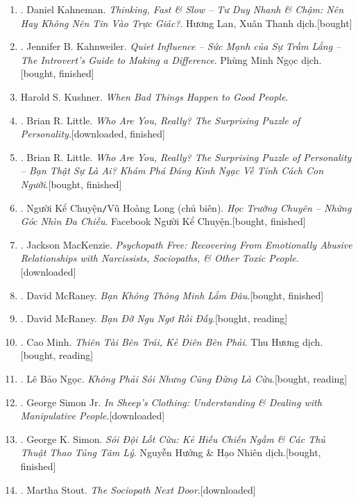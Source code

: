 \documentclass{article}
\begin{document}
\begin{enumerate}
	\item \cite{Kahneman2022}. Daniel Kahneman. \textit{Thinking, Fast \& Slow -- Tư Duy Nhanh \& Chậm: Nên Hay Không Nên Tin Vào Trực Giác?}. Hương Lan, Xuân Thanh dịch.\hfill\textsf{[bought]}
	\item \cite{Kahnweiler2022}. Jennifer B. Kahnweiler. \textit{Quiet Influence -- Sức Mạnh của Sự Trầm Lắng -- The Introvert's Guide to Making a Difference}. Phùng Minh Ngọc dịch.\hfill\textsf{[bought, finished]}
	\item Harold S. Kushner. \textit{When Bad Things Happen to Good People}.
	\item \cite{Little2017}. Brian R. Little. \textit{Who Are You, Really? The Surprising Puzzle of Personality}.\hfill\textsf{[downloaded, finished]}
	\item \cite{Little2023}. Brian R. Little. \textit{Who Are You, Really? The Surprising Puzzle of Personality -- Bạn Thật Sự Là Ai? Khám Phá Đáng Kinh Ngạc Về Tính Cách Con Người}.\hfill\textsf{[bought, finished]}
	\item \cite{Long_2021}. Người Kể Chuyện\texttt{/}Vũ Hoàng Long (chủ biên). \textit{Học Trường Chuyên -- Những Góc Nhìn Đa Chiều}. Facebook Người Kể Chuyện.\hfill\textsf{[bought, finished]}
	\item \cite{MacKenzie2015}. Jackson MacKenzie. \textit{Psychopath Free: Recovering From Emotionally Abusive Relationships with Narcissists, Sociopaths, \& Other Toxic People}.\hfill\textsf{[downloaded]}
	\item \cite{McRaney2022a}. David McRaney. \textit{Bạn Không Thông Minh Lắm Đâu}.\hfill\textsf{[bought, finished]}
	\item \cite{McRaney2022b}. David McRaney. \textit{Bạn Đỡ Ngu Ngơ Rồi Đấy}.\hfill\textsf{[bought, reading]}		
	\item \cite{Minh2022}. Cao Minh. \textit{Thiên Tài Bên Trái, Kẻ Điên Bên Phải}. Thu Hương dịch.\hfill\textsf{[bought, reading]}
	\item \cite{Ngoc2022}. Lê Bảo Ngọc. \textit{Không Phải Sói Nhưng Cũng Đừng Là Cừu}.\hfill\textsf{[bought, reading]}
	\item \cite{Simon2010}. George Simon Jr. \textit{In Sheep's Clothing: Understanding \& Dealing with Manipulative People}.\hfill\textsf{[downloaded]}
	\item \cite{Simon2022}. George K. Simon. \textit{Sói Đội Lốt Cừu: Kẻ Hiếu Chiến Ngầm \& Các Thủ Thuật Thao Túng Tâm Lý}. Nguyễn Hưởng \& Hạo Nhiên dịch.\hfill\textsf{[bought, finished]}
	\item \cite{Stout2006}. Martha Stout. \textit{The Sociopath Next Door}.\hfill\textsf{[downloaded]}

\end{enumerate}
\end{document}
